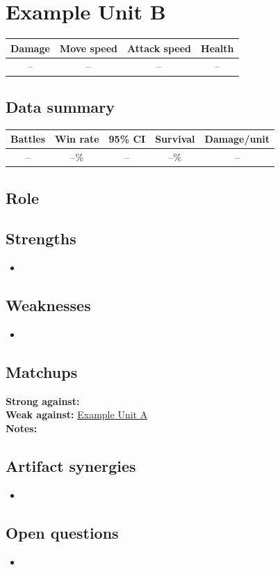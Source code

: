 \documentclass[11pt]{article}
\newcommand{\unit}[5]{%
  \section{#1}\label{unit:#1}
  \begin{center}
    \begin{tabular}{cccc}
      \toprule
      Damage & Move speed & Attack speed & Health \\
      \midrule
      #2 & #3 & #4 & #5 \\
      \bottomrule
    \end{tabular}
  \end{center}
}
\newcommand{\unitdata}[5]{%
  \subsection*{Data summary}
  \begin{center}
    \begin{tabular}{ccccc}
      \toprule
      Battles & Win rate & 95\% CI & Survival & Damage/unit \\
      \midrule
      #1 & #2 & #3 & #4 & #5 \\
      \bottomrule
    \end{tabular}
  \end{center}
}
\newcommand{\unitref}[1]{\hyperref[unit:#1]{#1}}
\begin{document}

\unit{Example Unit B}{--}{--}{--}{--}
\unitdata{--}{--\%}{--}{--\%}{--}

\subsection*{Role}

\subsection*{Strengths}
\begin{itemize}
  \item
\end{itemize}

\subsection*{Weaknesses}
\begin{itemize}
  \item
\end{itemize}

\subsection*{Matchups}
\textbf{Strong against:} \\
\textbf{Weak against:} \unitref{Example Unit A}\\
\textbf{Notes:}

\subsection*{Artifact synergies}
\begin{itemize}
  \item
\end{itemize}

\subsection*{Open questions}
\begin{itemize}
  \item
\end{itemize}
\end{document}
